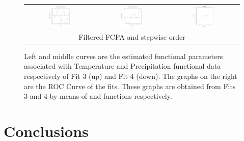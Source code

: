 \begin{figure}
\begin{center}
\begin{tabular}{ccc}
\includegraphics[width=0.33\textwidth]{Graphs/Fit4FunParam1.png} & \includegraphics[width=0.33\textwidth]{Graphs/Fit4FunParam2.png} & \includegraphics[width=0.33\textwidth]{Graphs/Fit4ROC.png}\\
\multicolumn{3}{c}{Filtered FCPA and stepwise order}\\
\end{tabular}
\end{center}
\caption{Left and middle curves are the estimated functional parameters associated with Temperature and Precipitation functional data respectively of Fit 3 (up) and Fit 4 (down). The graphs on the right are the ROC Curve of the fits. These graphs are obtained from Fits 3 and 4 by means of  and  functions respectively.}
\label{Fit34}
\end{figure}

\section{Conclusions}

